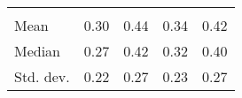 \begin{tabular}{lllll}
  \multicolumn{1}{|r}{} &
  \multicolumn{1}{r}{} &
  \multicolumn{1}{r}{} &
  \multicolumn{1}{r}{} \\
\multicolumn{1}{l}{\hspace{2em}Mean} &
  \multicolumn{1}{|r}{0.30} &
  \multicolumn{1}{r}{0.44} &
  \multicolumn{1}{r}{0.34} &
  \multicolumn{1}{r}{0.42} \\
\multicolumn{1}{l}{\hspace{2em}Median} &
  \multicolumn{1}{|r}{0.27} &
  \multicolumn{1}{r}{0.42} &
  \multicolumn{1}{r}{0.32} &
  \multicolumn{1}{r}{0.40} \\
\multicolumn{1}{l}{\hspace{2em}Std. dev.} &
  \multicolumn{1}{|r}{0.22} &
  \multicolumn{1}{r}{0.27} &
  \multicolumn{1}{r}{0.23} &
  \multicolumn{1}{r}{0.27} \\
\cline{1-5}
\end{tabular}
